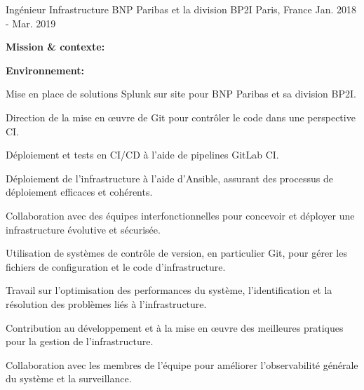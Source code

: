 \begin{cventries}
\cventry
{Ingénieur Infrastructure} %
{BNP Paribas et la division BP2I} %
{Paris, France} %
{Jan. 2018 - Mar. 2019} %
{
  \begin{cvitems} %
    \item {\textbf{Mission \& contexte:} }
    \item {\textbf{Environnement:} }
    \item {Mise en place de solutions Splunk sur site pour BNP Paribas et sa division BP2I.}
    \item {Direction de la mise en œuvre de Git pour contrôler le code dans une perspective CI.}
    \item {Déploiement et tests en CI/CD à l'aide de pipelines GitLab CI.}
    \item {Déploiement de l'infrastructure à l'aide d'Ansible, assurant des processus de déploiement efficaces et cohérents.}
    \item {Collaboration avec des équipes interfonctionnelles pour concevoir et déployer une infrastructure évolutive et sécurisée.}
    \item {Utilisation de systèmes de contrôle de version, en particulier Git, pour gérer les fichiers de configuration et le code d'infrastructure.}
    \item {Travail sur l'optimisation des performances du système, l'identification et la résolution des problèmes liés à l'infrastructure.}
    \item {Contribution au développement et à la mise en œuvre des meilleures pratiques pour la gestion de l'infrastructure.}
    \item {Collaboration avec les membres de l'équipe pour améliorer l'observabilité générale du système et la surveillance.}
  \end{cvitems}
}


\end{cventries}
